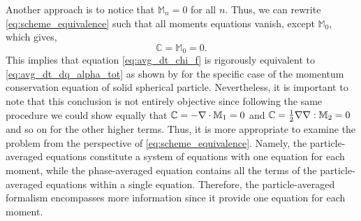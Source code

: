 Another approach is to notice that $\mathbb{M}_n=0$ for all $n$. Thus, we can rewrite \ref{eq:scheme_equivalence} such that all moments equations vanish, except $\mathbb{M}_0$, which gives, 
\begin{equation}
    \mathbb{C} = \mathbb{M}_0 = 0.
\end{equation}
This implies that equation \ref{eq:avg_dt_chi_f} is rigorously equivalent to \ref{eq:avg_dt_dq_alpha_tot} as shown by \cite[Appendix A]{nott2011suspension} for the specific case of the momentum conservation equation of solid spherical particle.
Nevertheless, it is important to note that this conclusion is not entirely objective since following the same procedure we could show equally that $\mathbb{C} = -\mathbf{\nabla}\cdot\mathbb{M}_1=0$ and $\mathbb{C} = \frac{1}{2}\mathbf{\nabla}\mathbf{\nabla}:\mathbb{M}_2=0$ and so on for the other higher terms. 
Thus, it is more appropriate to examine the problem from the perspective of \ref{eq:scheme_equivalence}. 
Namely, the particle-averaged equations constitute a system of equations with one equation for each moment, while the phase-averaged equation contains all the terms of the particle-averaged equations within a single equation.
Therefore, the particle-averaged formalism encompasses more information since it provide one equation for each moment. 




